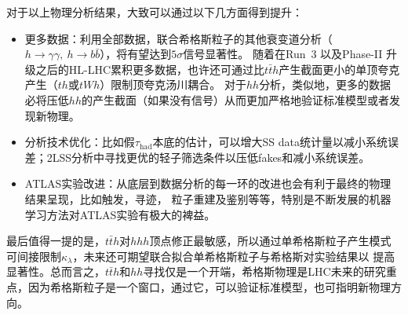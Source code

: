 对于以上物理分析结果，大致可以通过以下几方面得到提升：
\begin{itemize}
 \item 更多数据：利用全部\RunTwo 数据，联合希格斯粒子的其他衰变道分析（$h\rightarrow \gamma\gamma,~h\rightarrow b\bar{b}$），将有望达到$5\sigma$信号显著性。
随着在Run~3 以及Phase-II 升级之后的HL-LHC累积更多数据，也许还可通过比$t\bar{t}h$产生截面更小的单顶夸克产生（$th$或$tWh$）限制顶夸克汤川耦合。
对于$hh$分析，类似地，更多的数据必将压低$hh$的产生截面（如果没有信号）从而更加严格地验证标准模型或者发现新物理。
 \item 分析技术优化：比如假$\tau_{\text{had}}$本底的估计，可以增大SS data统计量以减小系统误差；2LSS分析中寻找更优的轻子筛选条件以压低fakes和减小系统误差。
 \item ATLAS实验改进：从底层到数据分析的每一环的改进也会有利于最终的物理结果呈现，比如触发，寻迹，
粒子重建及鉴别等等，特别是不断发展的机器学习方法对ATLAS实验有极大的裨益。
\end{itemize}

最后值得一提的是，$t\bar{t}h$对$hhh$顶点修正最敏感\cite{Maltoni:2017ims}，所以通过单希格斯粒子产生模式可间接限制$\kappa_{\lambda}$，未来还可期望联合拟合单希格斯粒子与希格斯对实验结果以
提高显著性。总而言之，$t\bar{t}h$和$hh$寻找仅是一个开端，希格斯物理是LHC未来的研究重点，因为希格斯粒子是一个窗口，通过它，可以验证标准模型，也可指明新物理方向。
